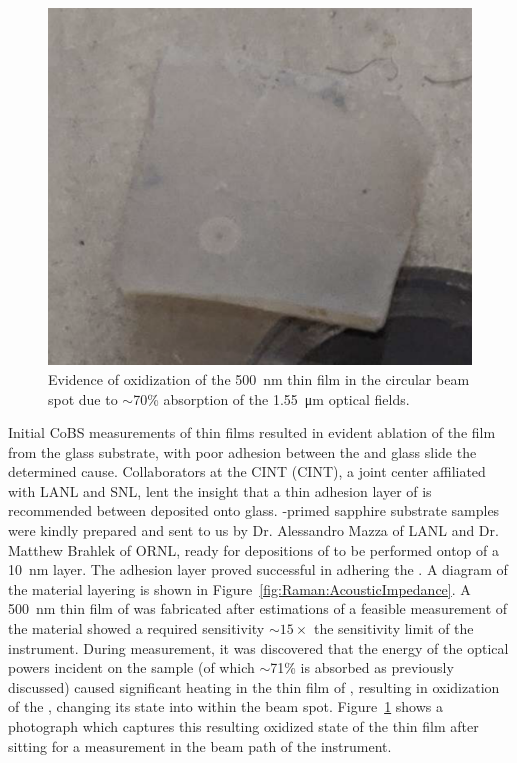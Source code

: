 \begin{figure}[h!]
  \centering
  \includegraphics[width=.3\textwidth]{figs/4-Raman/TeTeO2beamspot.png}
  \caption[Evidence of oxidization of the \SI{500}{\nano\meter}  thin film in the circular beam spot.]{Evidence of oxidization of the \SI{500}{\nano\meter}  thin film in the circular beam spot due to \(\sim\)70\% absorption of the \SI{1.55}{\micro\meter} optical fields.}
  \label{fig:Raman:TeTeO2beamspot}
\end{figure}

Initial \ac{CoBS} measurements of  thin films resulted in evident ablation of the film from the glass substrate, with poor adhesion between the  and glass slide the determined cause. Collaborators at the \acl{CINT} (\ac{CINT}), a joint center affiliated with \ac{LANL} and \ac{SNL}, lent the insight that a thin adhesion layer of  is recommended between  deposited onto glass. -primed sapphire substrate samples were kindly prepared and sent to us by Dr. Alessandro Mazza of \ac{LANL} and Dr. Matthew Brahlek of \ac{ORNL}, ready for depositions of  to be performed ontop of a \SI{10}{\nano\meter}  layer. The  adhesion layer proved successful in adhering the . A diagram of the material layering is shown in Figure~\ref{fig:Raman:AcousticImpedance}. A \SI{500}{\nano\meter} thin film of  was fabricated after estimations of a feasible measurement of the material showed a required sensitivity \(\sim\)\(15\times\) the sensitivity limit of the instrument. During measurement, it was discovered that the energy of the optical powers incident on the sample (of which \(\sim\)71\% is absorbed as previously discussed) caused significant heating in the thin film of , resulting in oxidization of the , changing its state into  within the beam spot. Figure~\ref{fig:Raman:TeTeO2beamspot} shows a photograph which captures this resulting oxidized state of the  thin film after sitting for a measurement in the beam path of the instrument.

